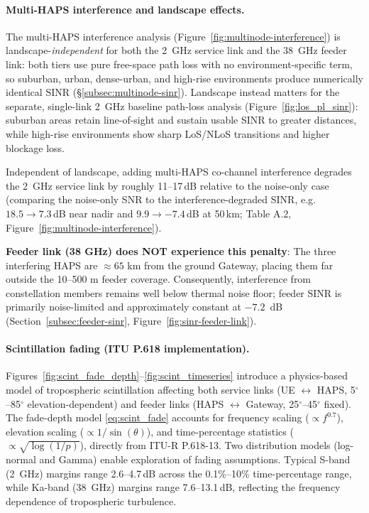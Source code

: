 \documentclass[conference]{IEEEtran}
\begin{document}
\paragraph{Multi-HAPS interference and landscape effects.}
The multi-HAPS interference analysis (Figure~\ref{fig:multinode-interference}) is landscape-\emph{independent} for both the 2~GHz service link and the 38~GHz feeder link: both tiers use pure free-space path loss with no environment-specific term, so suburban, urban, dense-urban, and high-rise environments produce numerically identical SINR (\S\ref{subsec:multinode-sinr}). Landscape instead matters for the separate, single-link 2~GHz baseline path-loss analysis (Figure~\ref{fig:los_pl_sinr}): suburban areas retain line-of-sight and sustain usable SINR to greater distances, while high-rise environments show sharp LoS/NLoS transitions and higher blockage loss.

Independent of landscape, adding multi-HAPS co-channel interference degrades the 2~GHz service link by roughly 11--17\,dB relative to the noise-only case (comparing the noise-only SNR to the interference-degraded SINR, e.g.\ $18.5\to7.3$\,dB near nadir and $9.9\to-7.4$\,dB at 50\,km; Table A.2, Figure~\ref{fig:multinode-interference}).

\noindent \textbf{Feeder link (38 GHz) does NOT experience this penalty}: The three interfering HAPS are $\approx 65$ km from the ground Gateway, placing them far outside the 10--500 m feeder coverage. Consequently, interference from constellation members remains well below thermal noise floor; feeder SINR is primarily noise-limited and approximately constant at $-7.2$~dB (Section~\ref{subsec:feeder-sinr}, Figure~\ref{fig:sinr-feeder-link}).

\paragraph{Scintillation fading (ITU P.618 implementation).}
Figures~\ref{fig:scint_fade_depth}--\ref{fig:scint_timeseries} introduce a physics-based model of tropospheric scintillation affecting both service links (UE $\leftrightarrow$ HAPS, 5$^\circ$--85$^\circ$ elevation-dependent) and feeder links (HAPS $\leftrightarrow$ Gateway, 25$^\circ$--45$^\circ$ fixed). The fade-depth model
\eqref{eq:scint_fade} accounts for frequency scaling ($\propto f^{0.7}$), elevation scaling
($\propto 1/\sin(\theta)$), and time-percentage statistics ($\propto \sqrt{\log(1/p)}$), directly from ITU-R P.618-13. Two distribution models (log-normal and Gamma) enable exploration of fading assumptions. Typical S-band (2~GHz) margins range 2.6--4.7\,dB across the 0.1\%--10\% time-percentage range, while Ka-band (38~GHz) margins range 7.6--13.1\,dB, reflecting the frequency dependence of tropospheric turbulence.
\end{document}
